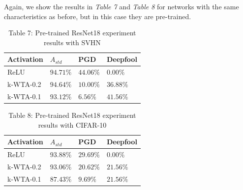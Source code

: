\documentclass[a4paper]{article}
\begin{document}
	Again, we show the results in \textit{Table 7} and \textit{Table 8} for networks with the same characteristics as before, but in this case they are pre-trained.
	\begin{table}[!htbp]
		\begin{tabular}{|p{}|p{}|p{}|p{}|}
			\hline
			Activation	& $A_{std}$	&	PGD	&	Deepfool	\\
			\hline
			ReLU		&$94.71\%$&$44.06\%$&$0.00\%$	\\
			\hline
			k-WTA-0.2	&$94.64\%$&$10.00\%$&$36.88\%$	\\
			\hline
			k-WTA-0.1	&$93.12\%$&$6.56\%$&$41.56\%$	\\
			\hline
		\end{tabular}
		\caption{Table 7: Pre-trained ResNet18 experiment results with SVHN}\label{pre-resnetSVHN}
	\end{table}
	\begin{table}[!htbp]
		\begin{tabular}{|p{}|p{}|p{}|p{}|}
			\hline
			Activation	& $A_{std}$	&	PGD	&	Deepfool	\\
			\hline
			ReLU		&$93.88\%$&$29.69\%$&$0.00\%$	\\
			\hline
			k-WTA-0.2	&$93.06\%$&$20.62\%$&$21.56\%$	\\
			\hline
			k-WTA-0.1	&$87.43\%$&$9.69\%$&$21.56\%$	\\
			\hline
		\end{tabular}
		\caption{Table 8: Pre-trained ResNet18 experiment results with CIFAR-10}\label{pre-resnetCIFAR10}
	\end{table}
\end{document}
